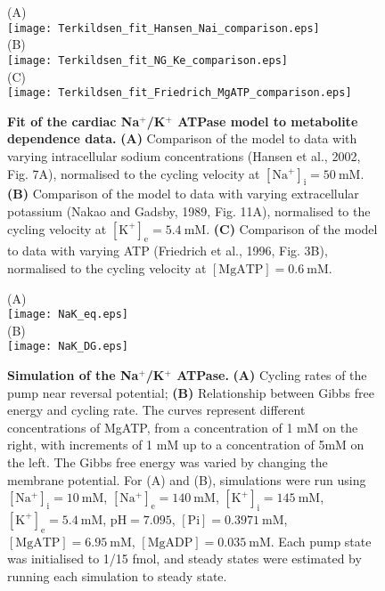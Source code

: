 \documentclass[11pt]{article}
\begin{document}
\begin{figure}
	\centering
	(A) \\
	\texttt{[image: Terkildsen\_fit\_Hansen\_Nai\_comparison.eps]} \\
	(B) \\
	\texttt{[image: Terkildsen\_fit\_NG\_Ke\_comparison.eps]} \\
	(C) \\
	\texttt{[image: Terkildsen\_fit\_Friedrich\_MgATP\_comparison.eps]}
	\caption{\textbf{Fit of the cardiac Na$^+$/K$^+$ ATPase model to metabolite dependence data.} \textbf{(A)} Comparison of the model to data with varying intracellular sodium concentrations  (Hansen et al., 2002, Fig. 7A), normalised to the cycling velocity at $\mathrm{[Na^+]_i = 50\ \mathrm{mM}}$. \textbf{(B)} Comparison of the model to data with varying extracellular potassium (Nakao and Gadsby, 1989, Fig. 11A), normalised to the cycling velocity at $\mathrm{[K^+]_e = 5.4\ \mathrm{mM}}$. \textbf{(C)} Comparison of the model to data with varying ATP  (Friedrich et al., 1996, Fig. 3B), normalised to the cycling velocity at $\mathrm{[MgATP] = 0.6\ \mathrm{mM}}$.} 
\end{figure}

\begin{figure}
	\centering
	(A) \\
	\texttt{[image: NaK\_eq.eps]} \\
	(B) \\
	\texttt{[image: NaK\_DG.eps]}
	\caption{\textbf{Simulation of the Na$^+$/K$^+$ ATPase.} \textbf{(A)} Cycling rates of the pump near reversal potential; \textbf{(B)} Relationship between Gibbs free energy and cycling rate. The curves represent different concentrations of MgATP, from a concentration of 1 mM on the right, with increments of 1 mM up to a concentration of 5mM on the left. The Gibbs free energy was varied by changing the membrane potential. For (A) and (B), simulations were run using $\mathrm{[Na^+]_i} = 10\ \mathrm{mM}$, $\mathrm{[Na^+]_e} = 140\ \mathrm{mM}$, $\mathrm{[K^+]_i} = 145\ \mathrm{mM}$, $\mathrm{[K^+]_e} = 5.4\ \mathrm{mM}$, $\mathrm{pH} = 7.095$, $\mathrm{[Pi]} = 0.3971\ \mathrm{mM}$, $\mathrm{[MgATP]} = 6.95\ \mathrm{mM}$, $\mathrm{[MgADP]} = 0.035\ \mathrm{mM}$. Each pump state was initialised to 1/15 fmol, and steady states were estimated by running each simulation to steady state.}
\end{figure}
\end{document}
